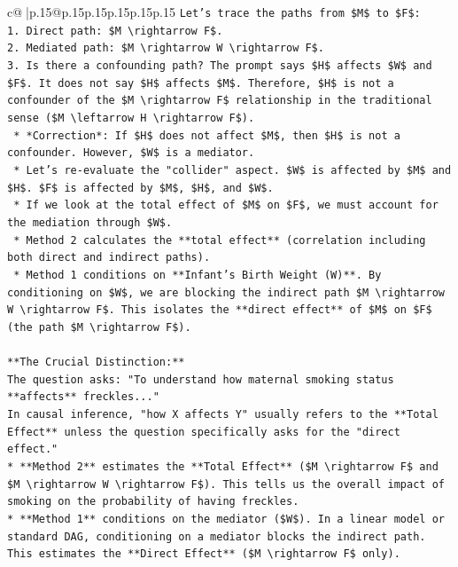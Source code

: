 \documentclass{article}
\begin{document}
{\begin{supertabular}{c@{$\;$}|p{.15\linewidth}@{}p{.15\linewidth}p{.15\linewidth}p{.15\linewidth}p{.15\linewidth}p{.15\linewidth}}
{{{\texttt{Let's trace the paths from \$M\$ to \$F\$:} \\
\texttt{1.  Direct path: \$M \textbackslash{}rightarrow F\$.} \\
\texttt{2.  Mediated path: \$M \textbackslash{}rightarrow W \textbackslash{}rightarrow F\$.} \\
\texttt{3.  Is there a confounding path? The prompt says \$H\$ affects \$W\$ and \$F\$. It does not say \$H\$ affects \$M\$. Therefore, \$H\$ is not a confounder of the \$M \textbackslash{}rightarrow F\$ relationship in the traditional sense (\$M \textbackslash{}leftarrow H \textbackslash{}rightarrow F\$).} \\
\texttt{    *   *Correction*: If \$H\$ does not affect \$M\$, then \$H\$ is not a confounder. However, \$W\$ is a mediator.} \\
\texttt{    *   Let's re{-}evaluate the "collider" aspect. \$W\$ is affected by \$M\$ and \$H\$. \$F\$ is affected by \$M\$, \$H\$, and \$W\$.} \\
\texttt{    *   If we look at the total effect of \$M\$ on \$F\$, we must account for the mediation through \$W\$.} \\
\texttt{    *   Method 2 calculates the **total effect** (correlation including both direct and indirect paths).} \\
\texttt{    *   Method 1 conditions on **Infant's Birth Weight (W)**. By conditioning on \$W\$, we are blocking the indirect path \$M \textbackslash{}rightarrow W \textbackslash{}rightarrow F\$. This isolates the **direct effect** of \$M\$ on \$F\$ (the path \$M \textbackslash{}rightarrow F\$).} \\
\\ 
\texttt{**The Crucial Distinction:**} \\
\texttt{The question asks: "To understand how maternal smoking status **affects** freckles..."} \\
\texttt{In causal inference, "how X affects Y" usually refers to the **Total Effect** unless the question specifically asks for the "direct effect."} \\
\texttt{*   **Method 2** estimates the **Total Effect** (\$M \textbackslash{}rightarrow F\$ and \$M \textbackslash{}rightarrow W \textbackslash{}rightarrow F\$). This tells us the overall impact of smoking on the probability of having freckles.} \\
\texttt{*   **Method 1** conditions on the mediator (\$W\$). In a linear model or standard DAG, conditioning on a mediator blocks the indirect path. This estimates the **Direct Effect** (\$M \textbackslash{}rightarrow F\$ only).} \\
}}}
\end{supertabular}}
\end{document}
